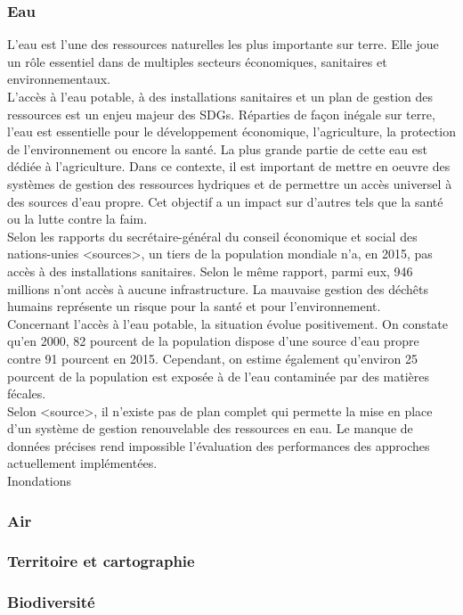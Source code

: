 \documentclass[10pt, conference, compsocconf]{llncs}
\begin{document}
\subsubsection{Eau}
L'eau est l'une des ressources naturelles les plus importante sur terre. Elle joue un rôle essentiel dans de multiples secteurs économiques, sanitaires et environnementaux.\\
L'accès à l'eau potable, à des installations sanitaires et un plan de gestion des ressources est un enjeu majeur des SDGs. Réparties de façon inégale sur terre, l'eau est essentielle pour le développement économique, l'agriculture, la protection de l'environnement ou encore la santé. La plus grande partie de cette eau est dédiée à l'agriculture. Dans ce contexte, il est important de mettre en oeuvre des systèmes de gestion des ressources hydriques et de permettre un accès universel à des sources d'eau propre. Cet objectif a un impact sur d'autres tels que la santé ou la lutte contre la faim.\\
Selon les rapports du secrétaire-général du conseil économique et social des nations-unies <sources>, un tiers de la population mondiale n'a, en 2015, pas accès à des installations sanitaires. Selon le même rapport, parmi eux, 946 millions n'ont accès à aucune infrastructure. La mauvaise gestion des déchêts humains représente un risque pour la santé et pour l'environnement.\\
Concernant l'accès à l'eau potable, la situation évolue positivement. On constate qu'en 2000, 82 pourcent de la population dispose d'une source d'eau propre contre 91 pourcent en 2015. Cependant, on estime également qu'environ 25 pourcent de la population est exposée à de l'eau contaminée par des matières fécales. \\
Selon <source>, il n'existe pas de plan complet qui permette la mise en place d'un système de gestion renouvelable des ressources en eau. Le manque de données précises rend impossible l'évaluation des performances des approches actuellement implémentées. \\
Inondations
\subsubsection{Air}
\subsubsection{Territoire et cartographie}
\subsubsection{Biodiversité}
\end{document}
